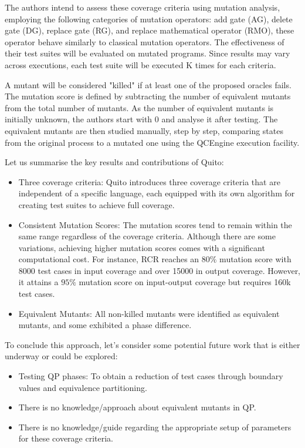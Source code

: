 \begin{itemize}
The authors intend to assess these coverage criteria using mutation analysis, employing the following categories of mutation operators: add gate (AG), delete gate (DG), replace gate (RG), and replace mathematical operator (RMO), these operator behave similarly to classical mutation operators. The effectiveness of their test suites will be evaluated on mutated programs. Since results may vary across executions, each test suite will be executed K times for each criteria.\newline

A mutant will be considered "killed" if at least one of the proposed oracles fails. The mutation score is defined by subtracting the number of equivalent mutants from the total number of mutants. As the number of equivalent mutants is initially unknown, the authors start with 0 and analyse it after testing. The equivalent mutants are then studied manually, step by step, comparing states from the original process to a mutated one using the QCEngine execution facility.\newline

Let us summarise the key results and contributions of Quito:
\begin{itemize}
    \item Three coverage criteria: Quito introduces three coverage criteria that are independent of a specific language, each equipped with its own algorithm for creating test suites to achieve full coverage.
    \item Consistent Mutation Scores: The mutation scores tend to remain within the same range regardless of the coverage criteria. Although there are some variations, achieving higher mutation scores comes with a significant computational cost. For instance, RCR reaches an $80\%$ mutation score with 8000 test cases in input coverage and over 15000 in output coverage. However, it attains a $95\%$ mutation score on input-output coverage but requires 160k test cases.
    \item Equivalent Mutants: All non-killed mutants were identified as equivalent mutants, and some exhibited a phase difference.
\end{itemize}

To conclude this approach, let's consider some potential future work that is either underway or could be explored:

\begin{itemize}
    \item Testing QP phases: To obtain a reduction of test cases through boundary values and equivalence partitioning.
    \item There is no knowledge/approach about equivalent mutants in QP.
    \item There is no knowledge/guide regarding the appropriate setup of parameters for these coverage criteria.
\end{itemize}



\end{itemize}

